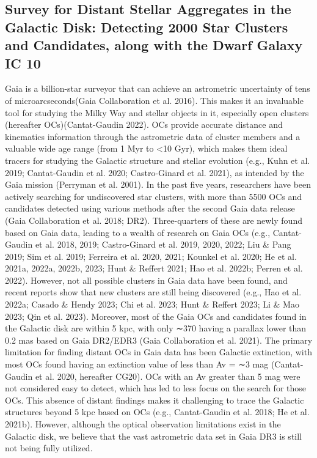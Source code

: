 \documentclass[../main.tex]{subfiles}
\begin{document}
\subsection{Survey for Distant Stellar Aggregates in the Galactic Disk: Detecting 2000 Star Clusters and Candidates, along with the Dwarf Galaxy IC 10} %
Gaia is a billion-star surveyor that can achieve an astrometric uncertainty of tens of microarcseconds(Gaia Collaboration et al. 2016). This makes it an invaluable tool for studying the Milky Way and stellar objects in it, especially open clusters (hereafter OCs)(Cantat-Gaudin 2022). OCs provide accurate distance and kinematics information through the astrometric data of cluster members and a valuable wide age range (from 1 Myr to <10 Gyr), which makes them ideal tracers for studying the Galactic structure and stellar evolution (e.g., Kuhn et al. 2019; Cantat-Gaudin et al. 2020; Castro-Ginard et al. 2021), as intended by the Gaia mission (Perryman et al. 2001).
In the past five years, researchers have been actively searching for undiscovered star clusters, with more than 5500 OCs and candidates detected using various methods after the second Gaia data release (Gaia Collaboration et al. 2018; DR2). Three-quarters of these are newly found based on Gaia data, leading to a wealth of research on Gaia OCs (e.g., Cantat-Gaudin et al. 2018, 2019; Castro-Ginard et al. 2019, 2020, 2022; Liu \& Pang 2019; Sim et al. 2019; Ferreira et al. 2020, 2021; Kounkel et al. 2020; He et al. 2021a, 2022a, 2022b, 2023; Hunt \& Reffert 2021; Hao et al. 2022b; Perren et al. 2022). However, not all possible clusters in Gaia data have been found, and recent reports show that new clusters are still being discovered (e.g., Hao et al. 2022a;
Casado \& Hendy 2023; Chi et al. 2023; Hunt \& Reffert 2023; Li \& Mao 2023; Qin et al. 2023).
Moreover, most of the Gaia OCs and candidates found in the Galactic disk are within 5 kpc, with only ∼370 having a parallax lower than 0.2 mas based on Gaia DR2/EDR3 (Gaia Collaboration et al. 2021). The primary limitation for finding distant OCs in Gaia data has been Galactic extinction, with most OCs found having an extinction value of less than Av = ∼3 mag (Cantat-Gaudin et al. 2020, hereafter CG20). OCs with an Av greater than 5 mag were not considered easy to detect, which has led to less focus on the search for those OCs. This absence of distant findings makes it challenging to trace the Galactic structures beyond 5 kpc based on OCs (e.g., Cantat-Gaudin et al. 2018; He et al. 2021b). However, although the optical observation limitations exist in the Galactic disk, we believe that the vast astrometric data set in Gaia DR3 is still not being fully utilized.
\end{document}
